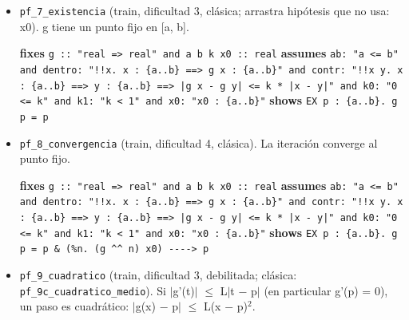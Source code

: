 \documentclass[11pt,a4paper]{article}
\begin{document}
\begin{itemize}
  \item \texttt{pf\_\allowbreak{}7\_\allowbreak{}existencia} (train, dificultad 3, clásica; arrastra hipótesis que no usa: x0). g tiene un punto fijo en [a, b].\\
  {\footnotesize \textbf{fixes} \texttt{g :\allowbreak{}:\allowbreak{} "real =\allowbreak{}> real" and a b k x0 :\allowbreak{}:\allowbreak{} real} \textbf{assumes} \texttt{ab:\allowbreak{} "a <=\allowbreak{} b" and dentro:\allowbreak{} "!{}!x. x :\allowbreak{} \{a..b\} =\allowbreak{}=\allowbreak{}> g x :\allowbreak{} \{a..b\}" and contr:\allowbreak{} "!{}!x y. x :\allowbreak{} \{a..b\} =\allowbreak{}=\allowbreak{}> y :\allowbreak{} \{a..b\} =\allowbreak{}=\allowbreak{}> |\allowbreak{}g x -\allowbreak{} g y|\allowbreak{} <=\allowbreak{} k *\allowbreak{} |\allowbreak{}x -\allowbreak{} y|\allowbreak{}" and k0:\allowbreak{} "0 <=\allowbreak{} k" and k1:\allowbreak{} "k < 1" and x0:\allowbreak{} "x0 :\allowbreak{} \{a..b\}"} \textbf{shows} \texttt{EX p :\allowbreak{} \{a..b\}. g p =\allowbreak{} p}\par}
  \item \texttt{pf\_\allowbreak{}8\_\allowbreak{}convergencia} (train, dificultad 4, clásica). La iteración converge al punto fijo.\\
  {\footnotesize \textbf{fixes} \texttt{g :\allowbreak{}:\allowbreak{} "real =\allowbreak{}> real" and a b k x0 :\allowbreak{}:\allowbreak{} real} \textbf{assumes} \texttt{ab:\allowbreak{} "a <=\allowbreak{} b" and dentro:\allowbreak{} "!{}!x. x :\allowbreak{} \{a..b\} =\allowbreak{}=\allowbreak{}> g x :\allowbreak{} \{a..b\}" and contr:\allowbreak{} "!{}!x y. x :\allowbreak{} \{a..b\} =\allowbreak{}=\allowbreak{}> y :\allowbreak{} \{a..b\} =\allowbreak{}=\allowbreak{}> |\allowbreak{}g x -\allowbreak{} g y|\allowbreak{} <=\allowbreak{} k *\allowbreak{} |\allowbreak{}x -\allowbreak{} y|\allowbreak{}" and k0:\allowbreak{} "0 <=\allowbreak{} k" and k1:\allowbreak{} "k < 1" and x0:\allowbreak{} "x0 :\allowbreak{} \{a..b\}"} \textbf{shows} \texttt{EX p :\allowbreak{} \{a..b\}. g p =\allowbreak{} p \&\allowbreak{} (\allowbreak{}\%n. (\allowbreak{}g \textasciicircum{}\textasciicircum{} n) x0) -\allowbreak{}{}-\allowbreak{}{}-\allowbreak{}{}-\allowbreak{}{}> p}\par}
  \item \texttt{pf\_\allowbreak{}9\_\allowbreak{}cuadratico} (train, dificultad 3, debilitada; clásica: \texttt{pf\_\allowbreak{}9c\_\allowbreak{}cuadratico\_\allowbreak{}medio}). Si $|$g'(t)$|$ $\le $ L$|$t $-$ p$|$ (en particular g'(p) = 0), un paso es cuadrático: $|$g(x) $-$ p$|$ $\le $ L(x $-$ p)$^{2}$.\\

\end{itemize}
\end{document}
